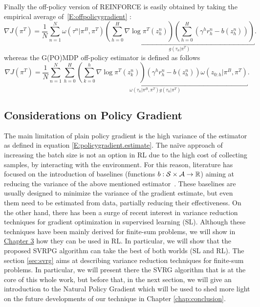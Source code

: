 Finally the off-policy version of REINFORCE is easily obtained by taking the empirical average of~\eqref{E:offpolicygradient} \citep{mastrangelo2015study}:
\[
\nabla J(\pi^T) = \frac{1}{N} \sum_{n=1}^{N} \omega(\tau^n|\pi^B, \pi^T)
\underbracket{
	\left(\sum_{h=0}^{H} \nabla \log \pi^{T}(z_h^n) \right)\left(\sum_{h=0}^{H}\left(\gamma^h r_h^n - b(z_h^n)\right)\right)
}_{g(\tau_n|\pi^T)}.
\]
whereas the G(PO)MDP off-policy estimator is defined as follows \citep{mastrangelo2015study}
\[
\nabla J(\pi^T) = \frac{1}{N} \sum_{n=1}^{N}
\underbracket{
	\sum_{h=0}^H \left(\sum_{k=0}^h \nabla \log\pi^T(z_k^n)\right) \left(\gamma^h r_h^n - b(z_h^n)\right) \omega(z_{0:h}|\pi^B,\pi^T)
}_{\omega(\tau_n|\pi^B,\pi^T)g(\tau_n|\pi^T)}.
\]
\subsection{Considerations on Policy Gradient}
The main limitation of plain policy gradient is the high variance of the estimator as defined in equation \ref{E:policygradient.estimate}.
The na\"ive approach of increasing the batch size is not an option in \acs{RL} due to the high cost of collecting samples, \ie by interacting with the environment.
For this reason, literature has focused on the introduction of baselines (\ie functions $b : \mathcal{S} \times \mathcal{A} \to \mathbb R$) aiming at reducing the variance of the above mentioned estimator~\citep[\eg][]{williams1992simple,Peters2008reinf,Thomas2017actionbaseline,wu2018variance}.
These baselines are usually designed to minimize the variance of the gradient estimate, but even them need to be estimated from data, partially reducing their effectiveness.
On the other hand, there has been a surge of recent interest in variance reduction techniques for gradient optimization in supervised learning (\acs{SL}).
Although these techniques have been mainly derived for finite-sum problems, we will show in \hyperref[chap:svrpg]{Chapter 3} how they can be used in \acs{RL}.
In particular, we will show that the proposed \acs{SVRPG} algorithm can take the best of both worlds (\ie \acs{SL} and \acs{RL}).
The section \ref{sec:svrg} aims at describing variance reduction techniques for finite-sum problems. In particular, we will present there the \acs{SVRG} algorithm that is at the core of this whole work, but before that, in the next section, we will give an introduction to the Natural Policy Gradient which will be used to shed more light on the future developments of our technique in Chapter  \ref{chap:conclusion}.


